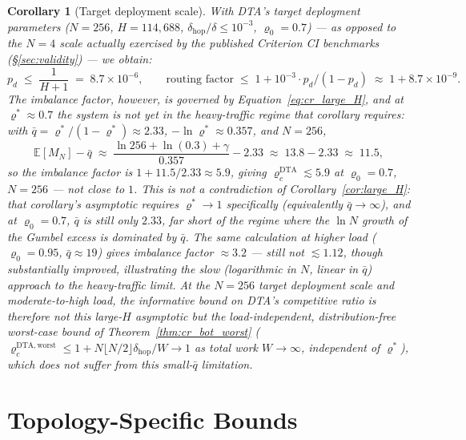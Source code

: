 \documentclass[11pt,a4paper]{article}
\newtheorem{corollary}[theorem]{Corollary}
\begin{document}
\begin{corollary}[Target deployment scale]\label{cor:benchmark}
With DTA's \emph{target deployment} parameters ($N = 256$, $H = 114{,}688$,
$\delta_{\mathrm{hop}}/\delta \le 10^{-3}$, $\varrho_0 = 0.7$) --- as
opposed to the $N=4$ scale actually exercised by the published Criterion
CI benchmarks (\S\ref{sec:validity}) --- we obtain:
\[
  p_d \;\le\; \frac{1}{H+1} \;=\; 8.7 \times 10^{-6},
  \qquad
  \text{routing factor} \;\le\; 1 + 10^{-3} \cdot p_d / (1-p_d)
  \;\approx\; 1 + 8.7\times 10^{-9}.
\]
The \emph{imbalance} factor, however, is governed by
Equation~\eqref{eq:cr_large_H}, and at $\varrho^* \approx 0.7$ the system
is not yet in the heavy-traffic regime that corollary requires: with
$\bar q = \varrho^*/(1-\varrho^*) \approx 2.33$,
$-\ln\varrho^* \approx 0.357$, and $N=256$,
\[
  \mathbb{E}[M_N] - \bar q
  \;\approx\;
  \frac{\ln 256 + \ln(0.3) + \gamma}{0.357} - 2.33
  \;\approx\; 13.8 - 2.33 \;\approx\; 11.5,
\]
so the imbalance factor is $1 + 11.5/2.33 \approx 5.9$, giving
$\varrho_c^{\mathrm{DTA}} \lesssim 5.9$ at $\varrho_0 = 0.7$, $N=256$ ---
\emph{not} close to $1$. This is not a contradiction of
Corollary~\ref{cor:large_H}: that corollary's asymptotic requires
$\varrho^* \to 1$ specifically (equivalently $\bar q \to \infty$), and at
$\varrho_0 = 0.7$, $\bar q$ is still only $2.33$, far short of the
regime where the $\ln N$ growth of the Gumbel excess is dominated by
$\bar q$. The same calculation at higher load ($\varrho_0=0.95$,
$\bar q \approx 19$) gives imbalance factor $\approx 3.2$ --- still not
$\lesssim 1.12$, though substantially improved, illustrating the slow
(logarithmic in $N$, linear in $\bar q$) approach to the heavy-traffic
limit. At
the $N=256$ target deployment scale and moderate-to-high load, the
informative bound on DTA's competitive ratio is therefore not this
large-$H$ asymptotic but the load-independent, distribution-free
worst-case bound of Theorem~\ref{thm:cr_bot_worst}
($\varrho_c^{\mathrm{DTA,worst}} \leq 1 + N\lfloor N/2\rfloor
\delta_{\mathrm{hop}}/W \to 1$ as total work $W \to \infty$, independent
of $\varrho^*$), which does not suffer from this small-$\bar q$
limitation.
\end{corollary}

\section{Topology-Specific Bounds}
\end{document}
